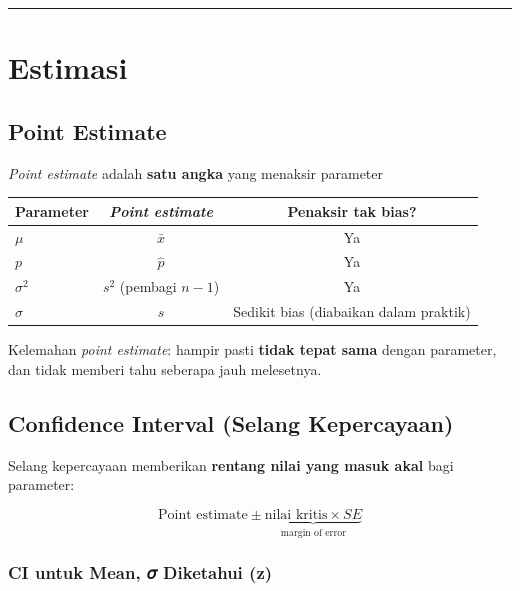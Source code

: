 \documentclass[
  indonesian,
  letterpaper,
]{book}
\newcounter{none} %
\begin{document}
\begin{center}\rule{0.5\linewidth}{0.5pt}\end{center}


\chapter{Estimasi}\label{estimasi}

\section{Point Estimate}\label{point-estimate}

\emph{Point estimate} adalah \textbf{satu angka} yang menaksir parameter

{\def\LTcaptype{none} %
\begin{longtable}[]{@{}lcc@{}}
\toprule\noalign{}
Parameter & \emph{Point estimate} & Penaksir tak bias? \\
\midrule\noalign{}
\endhead
\bottomrule\noalign{}
\endlastfoot
\(\mu\) & \(\bar{x}\) & Ya \\
\(p\) & \(\hat{p}\) & Ya \\
\(\sigma^2\) & \(s^2\) (pembagi \(n-1\)) & Ya \\
\(\sigma\) & \(s\) & Sedikit bias (diabaikan dalam praktik) \\
\end{longtable}
}

Kelemahan \emph{point estimate}: hampir pasti \textbf{tidak tepat sama}
dengan parameter, dan tidak memberi tahu seberapa jauh melesetnya.

\section{Confidence Interval (Selang
Kepercayaan)}\label{confidence-interval-selang-kepercayaan}

Selang kepercayaan memberikan \textbf{rentang nilai yang masuk akal}
bagi parameter:

\[
\text{Point estimate} \pm 
\underbrace{\text{nilai kritis} \times SE}_{\text{margin of error}}
\]

\subsection{CI untuk Mean, 𝜎 Diketahui
(z)}\label{ci-untuk-mean-ux1d70e-diketahui-z}
\end{document}
